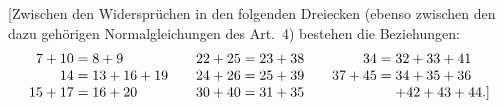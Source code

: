 [Zwischen den Widersprüchen in den folgenden Dreiecken (ebenso zwischen den dazu gehörigen Normalgleichungen des Art.~4) bestehen die Beziehungen:
\[
\begin{array}{r@{\;}c@{\;}l@{\qquad}r@{\;}c@{\;}l@{\qquad}r@{\;}c@{\;}l}
7+10&=&8+9&22+25&=&23+38&34&=&32+33+41\\
14&=&13+16+19&24+26&=&25+39&37+45&=&34+35+36\\
15+17&=&16+20&30+40&=&31+35&&&+42+43+44.\text{]}
\end{array}
\]
\endgroup
